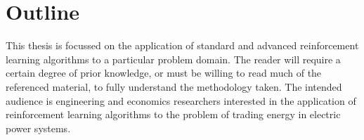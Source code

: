 \section{Outline}%
This thesis is focussed on the application of standard and advanced
reinforcement learning algorithms to a particular problem domain.  The reader
will require a certain degree of prior knowledge, or must be willing to read
much of the referenced material, to fully understand the methodology taken.
The intended audience is engineering and economics researchers interested in
the application of reinforcement learning algorithms to the problem of trading
energy in electric power systems.

%
%
%
%
%
%
%
%
%
